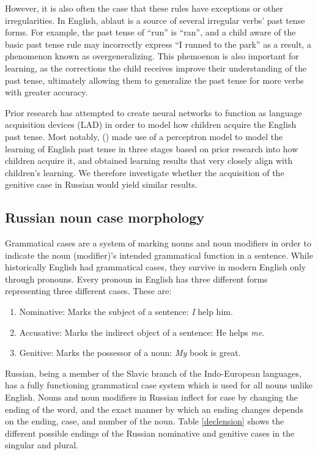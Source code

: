 \documentclass[11pt,a4paper]{article}
\newcommand{\citenp}[1]{\citeauthor{#1} (\citeyear{#1})}
\begin{document}
However, it is also often the case that these rules have exceptions or other
irregularities. In English, ablaut is a source of several irregular verbs'
past tense forms. For example, the past tense of ``run'' is ``ran'', and
a child aware of the basic past tense rule may incorrectly express
``I runned to the park'' as a result, a phenomenon known as overgeneralizing.
This phemoenon is also important for learning, as the corrections the child
receives improve their understanding of the past tense, ultimately allowing
them to generalize the past tense for more verbs with greater accuracy.

Prior research has attempted to create neural networks to function as
language acquisition devices (LAD) in order to model how children acquire
the English past tense. Most notably, \citenp{RMcC}
made use of a perceptron model to model the learning of English past
tense in three stages based on prior research into how children
acquire it, and obtained learning results that very closely
align with children's learning. We therefore investigate whether
the acquisition of the genitive case in Russian would yield similar results.

\subsection{Russian noun case morphology}

Grammatical cases are a system of marking nouns and noun modifiers in order
to indicate the noun (modifier)'s intended grammatical function in a sentence.
While historically English had grammatical cases, they survive in modern English
only through pronouns. Every pronoun in English has three different forms representing
three different cases. These are:

\begin{enumerate}
    \item Nominative: Marks the subject of a sentence: \emph{I} help him.
    \item Accusative: Marks the indirect object of a sentence: He helps \emph{me}.
    \item Genitive: Marks the possessor of a noun: \emph{My} book is great.
\end{enumerate}

Russian, being a member of the Slavic branch of the Indo-European languages,
has a fully functioning grammatical case system which is used for all nouns
unlike English. Nouns and noun modifiers in Russian inflect for case
by changing the ending of the word, and the exact manner by which an ending
changes depends on the ending, case, and number of the noun. Table \ref{declension} shows 
the different possible endings of the Russian nominative and genitive cases in 
the singular and plural. 
\end{document}
